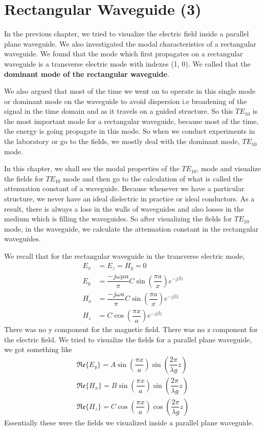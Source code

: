 \chapter{Rectangular Waveguide (3)}
In the previous chapter, we tried to visualize the electric field inside a parallel plane waveguide. We also investigated the modal characteristics of a rectangular waveguide. We found that the mode which first propagates on a rectangular waveguide is a transverse electric mode with indexes (1, 0). We called that the \textbf{dominant mode of the rectangular waveguide}. 
	
We also argued that most of the time we went on to operate in this single mode or dominant mode on the waveguide to avoid dispersion i.e broadening of the signal in the time domain and as it travels on a guided structure. So this $TE_{10}$  is the most important mode for a rectangular waveguide, because most of the time, the energy is going propagate in this mode. So when we conduct experiments in the laboratory or go to the fields, we mostly deal with the dominant mode,  $TE_{10}$ mode.

In this chapter, we shall see the modal properties of the $TE_{10}$, mode and visualize the fields for $TE_{10}$ mode and then go to the calculation of what is called the attenuation constant of a waveguide. Because whenever we have a particular structure, we never have an ideal dielectric in practice or ideal conductors. As a result, there is always a loss in the walls of waveguides and also losses in the medium which is filling the waveguides. So after visualizing the fields for $TE_{10}$ mode, in the waveguide, we calculate the attenuation constant in the rectangular waveguides.

We recall that for the rectangular waveguide in the transverse electric mode,
\begin{align*}
E_{x} &= E_{z} = H_{y} = 0\\
E_{y} &= \dfrac{-j\omega\mu a }{\pi} C\sin(\dfrac{\pi a}{x}) e ^{-j\beta z}\\
H_{x} &= \dfrac{-j\omega a}{\pi} C \sin(\dfrac{\pi a}{x})e^{-j\beta z} \\
H_{z} &= C\cos(\dfrac{\pi x}{a}) e^{-j\beta z}
\end{align*}
There was no y component for the magnetic field. There was no z component for the electric field. We tried to visualize the fields for a parallel plane waveguide, we got something like 
\begin{align}
\mathfrak{Re}\{E_{y}\} = A\sin(\dfrac{\pi x}{a})\sin(\dfrac{2\pi}{\lambda g}z)
\label{eqn:eyppw}\\
\mathfrak{Re}\{H_{x}\} = B\sin(\dfrac{\pi x}{a})\sin(\dfrac{2\pi}{\lambda g}z)\\
\mathfrak{Re}\{H_{z}\} = C\cos(\dfrac{\pi x}{a})\cos(\dfrac{2\pi}{\lambda g}z)
\end{align}
Essentially these were the fields we visualized inside a parallel plane waveguide.


